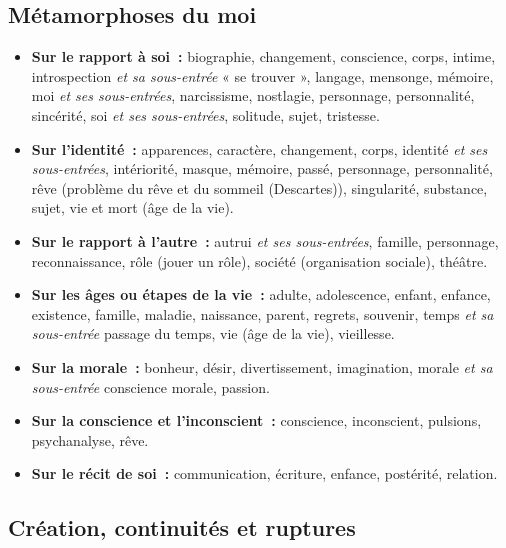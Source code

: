 
\subsection{Métamorphoses du moi}

\begin{itemize}\setlength{\itemsep}{6pt}

\item \textbf{Sur le rapport à soi~:} biographie, changement, conscience, corps, intime, introspection \textit{et sa sous-entrée} « se trouver », langage, mensonge, mémoire, moi \textit{et ses sous-entrées}, narcissisme, nostlagie, personnage, personnalité, sincérité, soi \textit{et ses sous-entrées}, solitude, sujet, tristesse.

\item \textbf{Sur l'identité~:} apparences, caractère, changement, corps, identité \textit{et ses sous-entrées}, intériorité, masque, mémoire, passé, personnage, personnalité, rêve (problème du rêve et du sommeil (Descartes)), singularité, substance, sujet, vie et mort (âge de la vie).

\item \textbf{Sur le rapport à l'autre~:} autrui \textit{et ses sous-entrées}, famille, personnage, reconnaissance, rôle (jouer un rôle), société (organisation sociale), théâtre.

\item \textbf{Sur les âges ou étapes de la vie~:} adulte, adolescence,  enfant, enfance, existence, famille, maladie, naissance, parent, regrets, souvenir, temps \textit{et sa sous-entrée} passage du temps, vie (âge de la vie), vieillesse.

\item \textbf{Sur la morale~:} bonheur, désir, divertissement, imagination, morale \textit{et sa sous-entrée} conscience morale, passion.

\item \textbf{Sur la conscience et l'inconscient~:} conscience, inconscient, pulsions, psychanalyse, rêve.

\item \textbf{Sur le récit de soi~:} communication, écriture, enfance, postérité, relation.

\end{itemize}

\subsection{Création, continuités et ruptures}

